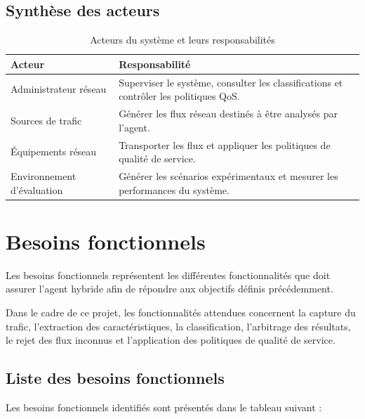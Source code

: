\subsection{Synthèse des acteurs}

\begin{table}[H]
\centering
\caption{Acteurs du système et leurs responsabilités}
\label{tab:acteurs}
\small
\begin{tabularx}{\textwidth}{|p{3.2cm}|Y|}
\hline
\textbf{Acteur} & \textbf{Responsabilité} \\
\hline
Administrateur réseau &
Superviser le système, consulter les classifications et
contrôler les politiques QoS. \\
\hline
Sources de trafic &
Générer les flux réseau destinés à être analysés par l'agent. \\
\hline
Équipements réseau &
Transporter les flux et appliquer les politiques de qualité
de service. \\
\hline
Environnement d'évaluation &
Générer les scénarios expérimentaux et mesurer les performances
du système. \\
\hline
\end{tabularx}
\end{table}



\section{Besoins fonctionnels}

Les besoins fonctionnels représentent les différentes
fonctionnalités que doit assurer l'agent hybride afin de répondre
aux objectifs définis précédemment.

Dans le cadre de ce projet, les fonctionnalités attendues
concernent la capture du trafic, l'extraction des caractéristiques,
la classification, l'arbitrage des résultats, le rejet des flux
inconnus et l'application des politiques de qualité de service.

\subsection{Liste des besoins fonctionnels}

Les besoins fonctionnels identifiés sont présentés dans
le tableau suivant :

